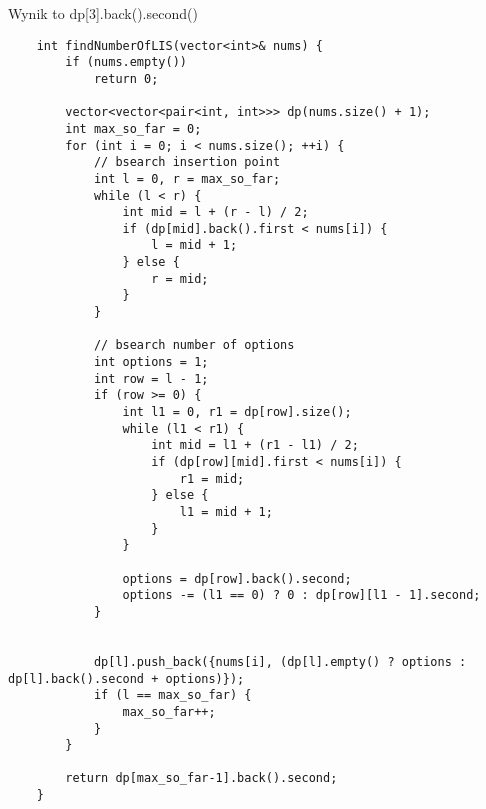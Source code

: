 \documentclass[12pt]{article}
\begin{document}
Wynik to dp[3].back().second()\\



\begin{lstlisting}
    int findNumberOfLIS(vector<int>& nums) {
        if (nums.empty())
            return 0;
        
        vector<vector<pair<int, int>>> dp(nums.size() + 1);
        int max_so_far = 0;
        for (int i = 0; i < nums.size(); ++i) {
            // bsearch insertion point
            int l = 0, r = max_so_far;
            while (l < r) {
                int mid = l + (r - l) / 2;
                if (dp[mid].back().first < nums[i]) {
                    l = mid + 1;
                } else {
                    r = mid;
                }
            }
            
            // bsearch number of options
            int options = 1;
            int row = l - 1;
            if (row >= 0) {
                int l1 = 0, r1 = dp[row].size();
                while (l1 < r1) {
                    int mid = l1 + (r1 - l1) / 2;
                    if (dp[row][mid].first < nums[i]) {
                        r1 = mid;
                    } else {
                        l1 = mid + 1;
                    }
                }
                
                options = dp[row].back().second;
                options -= (l1 == 0) ? 0 : dp[row][l1 - 1].second;
            }
            
            
            dp[l].push_back({nums[i], (dp[l].empty() ? options : dp[l].back().second + options)});
            if (l == max_so_far) {
                max_so_far++;
            }
        }
        
        return dp[max_so_far-1].back().second;
    }
\end{lstlisting}

\egroup
\end{document}
